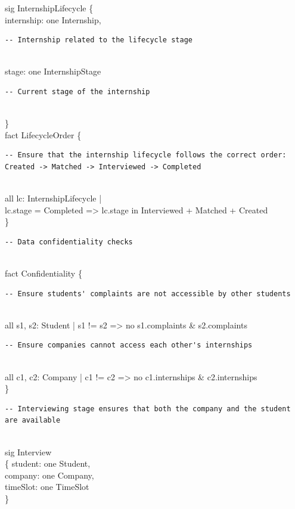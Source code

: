 sig InternshipLifecycle \{ \\
  internship: one Internship, \begin{verbatim}
-- Internship related to the lifecycle stage
\end{verbatim}\\
  stage: one InternshipStage  \begin{verbatim}
-- Current stage of the internship
\end{verbatim}\\
\} \\

fact LifecycleOrder \{ \\
  \begin{verbatim}
-- Ensure that the internship lifecycle follows the correct order: Created -> Matched -> Interviewed -> Completed
\end{verbatim}\\
  all lc: InternshipLifecycle | \\
    lc.stage = Completed => lc.stage in Interviewed + Matched + Created \\
\} \\

\begin{verbatim}
-- Data confidentiality checks
\end{verbatim}\\
fact Confidentiality \{ \\
  \begin{verbatim}
-- Ensure students' complaints are not accessible by other students
\end{verbatim}\\
  all s1, s2: Student | s1 != s2 => no s1.complaints \& s2.complaints \\

  \begin{verbatim}
-- Ensure companies cannot access each other's internships
\end{verbatim}\\
  all c1, c2: Company | c1 != c2 => no c1.internships \& c2.internships \\
\} \\

\begin{verbatim}
-- Interviewing stage ensures that both the company and the student are available
\end{verbatim}\\
sig Interview\\ \{
  student: one Student, \\
  company: one Company, \\
  timeSlot: one TimeSlot \\
\}


